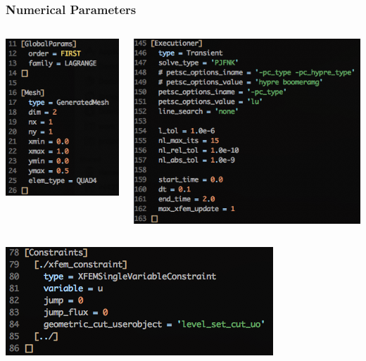 \documentclass[]{beamer}
\begin{document}
\begin{frame}\frametitle{Numerical Parameters}
  	\begin{columns}
			\begin{center}
			\includegraphics[scale=0.4]{figures/Screen-GlobalParams-1Dxyls1m}
			\end{center}
			\begin{center}
			\includegraphics[scale=0.4]{figures/Screen-Executioner-1Dxyls1m}
			\end{center}
	\end{columns}
	\begin{center}
	\includegraphics[scale=0.4]{figures/Screen-Constraints-1Dxyls1m}
	\end{center}
\end{frame}
\end{document}
